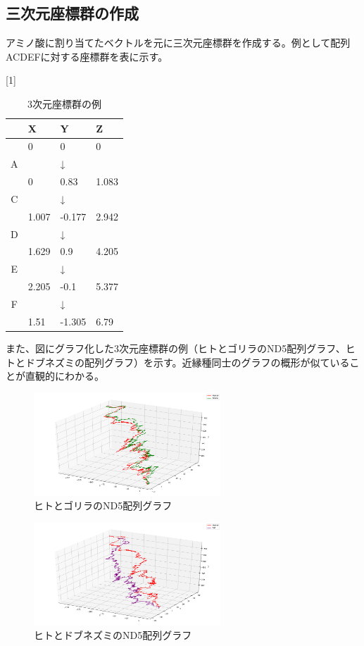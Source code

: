 \documentclass[twocolumn,paper=a4paper,landscape,fontsize=9pt]{jlreq}
\begin{document}
\subsection{三次元座標群の作成}
アミノ酸に割り当てたベクトルを元に三次元座標群を作成する。例として配列ACDEFに対する座標群を表に示す。

\newpage
\begin{table}[h]
\centering
\caption{3次元座標群の例}
\scalebox{1}[1]{
\begin{tabular}{c|lll}\hline
&X&Y&Z \\ \hline
&0&0&0 \\[-2mm]
A&&↓&\\[-2mm]
&0&0.83&1.083\\[-2mm]
C&&↓&\\[-2mm]
&1.007&-0.177&2.942\\[-2mm]
D&&↓&\\[-2mm]
&1.629&0.9&4.205\\[-2mm]
E&&↓&\\[-2mm]
&2.205&-0.1&5.377\\[-2mm]
F&&↓&\\[-2mm]
&1.51&-1.305&6.79\\ \hline
\end{tabular}}
\end{table}

また、図にグラフ化した3次元座標群の例（ヒトとゴリラのND5配列グラフ、ヒトとドブネズミの配列グラフ）を示す。近縁種同士のグラフの概形が似ていることが直観的にわかる。

\begin{figure}[H]
  \centering
  \includegraphics[width=70mm]{human_gorilla.png}
  \caption{ヒトとゴリラのND5配列グラフ}
\end{figure}

\begin{figure}[H]
  \centering
  \includegraphics[width=70mm]{human_rat.png}
  \caption{ヒトとドブネズミのND5配列グラフ}
\end{figure}
  
\end{document}
